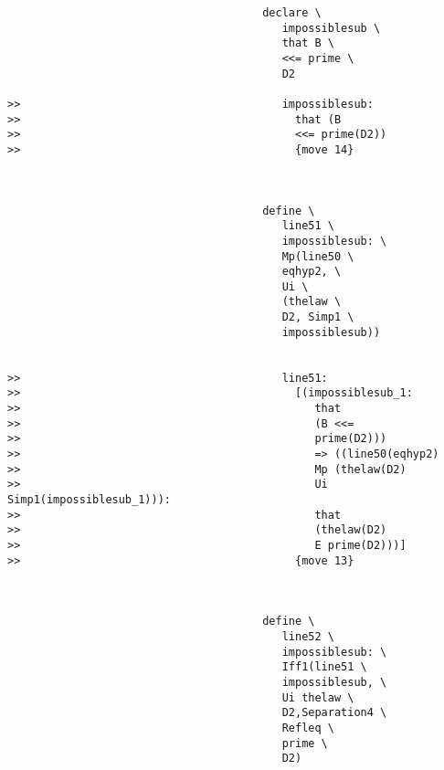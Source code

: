 \documentclass[12pt]{article}
\begin{document}
\begin{verbatim}
                                       declare \
                                          impossiblesub \
                                          that B \
                                          <<= prime \
                                          D2

>>                                        impossiblesub:
>>                                          that (B
>>                                          <<= prime(D2))
>>                                          {move 14}



                                       define \
                                          line51 \
                                          impossiblesub: \
                                          Mp(line50 \
                                          eqhyp2, \
                                          Ui \
                                          (thelaw \
                                          D2, Simp1 \
                                          impossiblesub))


>>                                        line51:
>>                                          [(impossiblesub_1:
>>                                             that
>>                                             (B <<=
>>                                             prime(D2)))
>>                                             => ((line50(eqhyp2)
>>                                             Mp (thelaw(D2)
>>                                             Ui Simp1(impossiblesub_1))):
>>                                             that
>>                                             (thelaw(D2)
>>                                             E prime(D2)))]
>>                                          {move 13}



                                       define \
                                          line52 \
                                          impossiblesub: \
                                          Iff1(line51 \
                                          impossiblesub, \
                                          Ui thelaw \
                                          D2,Separation4 \
                                          Refleq \
                                          prime \
                                          D2)


\end{verbatim}
\end{document}
